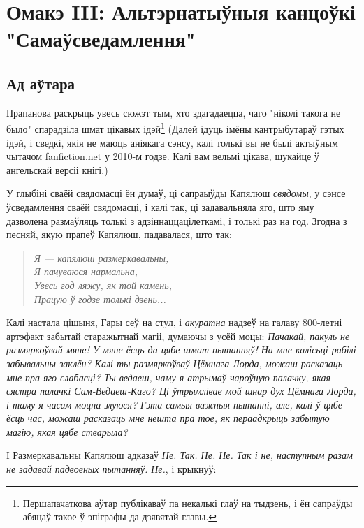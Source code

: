 \section{Омакэ III: Альтэрнатыўныя канцоўкі "Самаўсведамлення"}

\subsection{Ад аўтара}

Прапанова раскрыць увесь сюжэт тым, хто здагадаецца, чаго "ніколі такога не было" 
спарадзіла шмат цікавых ідэй\footnote{{} Першапачаткова
аўтар публікаваў па некалькі глаў на тыдзень, і ён сапраўды абяцаў такое
ў эпіграфы да дзявятай главы.}
(Далей ідуць імёны кантрыбутараў гэтых ідэй, і сведкі, якія не маюць 
аніякага сэнсу, калі толькі вы не былі актыўным чытачом fanfiction.net у
2010-м годзе. Калі вам вельмі цікава, шукайце ў ангельскай версіі кнігі.)

\later
У глыбіні сваёй свядомасці ён думаў, ці сапраыўды Капялюш \emph{свядомы},
у сэнсе ўсведамлення сваёй свядомасці, і калі так, ці задавальняла яго,
што яму дазволена размаўляць толькі з адзіннаццацілеткамі, і толькі раз на год. 
Згодна з песняй, якую прапеў Капялюш, падавалася, што так:

\begin{verse}%
    \itshape
    Я --- капялюш размеркавальны,\\
    Я пачуваюся нармальна,\\
    Увесь год ляжу, як той камень,\\
    Працую ў годзе толькі дзень...
\end{verse}

Калі настала цішыня, Гары сеў на стул, і \emph{акуратна} надзеў на галаву 
800-летні артэфакт забытай старажытнай магіі, думаючы з усёй моцы: 
\emph{Пачакай, пакуль не размяркоўвай мяне! У мяне ёсць да цябе шмат  
пытанняў! На мне калісьці рабілі забывальны заклён?
Калі ты размяркоўваў Цёмнага Лорда, можаш расказаць мне пра яго слабасці? 
Ты ведаеш, чаму я атрымаў чароўную палачку, якая сястра палачкі Сам-Ведаеш-Каго?
Ці ўтрымлівае мой шнар дух Цёмнага Лорда, і таму я часам моцна злуюся?
Гэта самыя важныя пытанні, але, калі ў цябе ёсць час,
можаш расказаць мне нешта пра тое, як пераадкрыць забытую магію, якая цябе стварыла?}

І Размеркавальны Капялюш адказаў \emph{Не. Так. Не. Не. Так і не, наступным разам не задавай падвоеных 
пытанняў. Не.}, і крыкнуў: 

